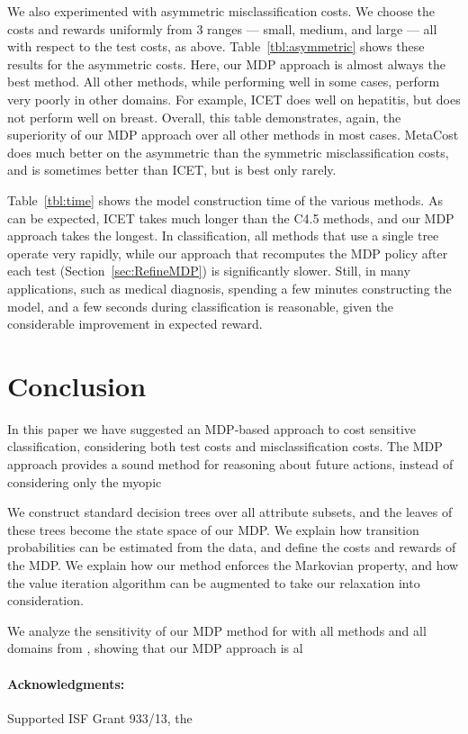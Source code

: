 \documentclass[letterpaper]{article}
\theoremstyle{definition}
\begin{document}
We also experimented with asymmetric misclassification costs. We choose the costs and rewards uniformly from 3 ranges --- small, medium, and large --- all with respect to the test costs, as above. Table~\ref{tbl:asymmetric} shows these results for the asymmetric costs. Here, our MDP approach is almost always the best method. All other methods, while performing well in some cases, perform very poorly in other domains. For example, ICET does well on hepatitis, but does not perform well on breast. Overall, this table demonstrates, again, the superiority of our MDP approach over all other methods in most cases. MetaCost does much better on the asymmetric than the symmetric misclassification costs, and is sometimes better than ICET, but is best only rarely.

Table~\ref{tbl:time} shows the model construction time of the various methods. As can be expected, ICET takes much longer than the C4.5 methods, and our MDP approach takes the longest. In classification, all methods that use a single tree operate very rapidly, while our approach that recomputes the MDP policy after each test (Section~\ref{sec:RefineMDP}) is significantly slower. Still, in many applications, such as medical diagnosis, spending a few minutes constructing the model, and a few seconds during classification is reasonable, given the considerable improvement in expected reward.



\section{Conclusion}

In this paper we have suggested an MDP-based approach to cost sensitive classification, considering both test costs and misclassification costs. The MDP approach provides a sound method for reasoning about future actions, instead of considering only the myopic 

We construct standard decision trees over all attribute subsets, and the leaves of these trees become the state space of our MDP. We explain how transition probabilities can be estimated from the data, and define the costs and rewards of the MDP. We explain how our method enforces the Markovian property, and how the value iteration algorithm can be augmented to take our relaxation into consideration.

We analyze the sensitivity of our MDP method for   with all methods and all domains from \cite{LomaxV11}, showing that our MDP approach is al

  

\paragraph{\bf Acknowledgments:} Supported  ISF Grant 933/13,  the    


\clearpage

\end{document}

